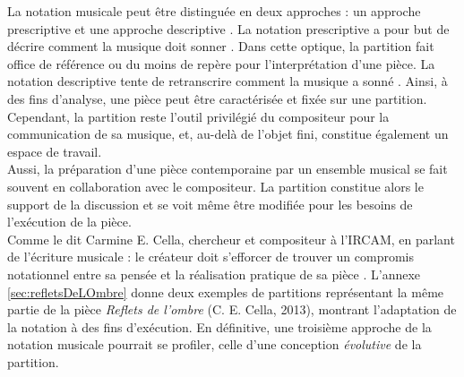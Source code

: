 La notation musicale peut être distinguée en deux approches : un approche prescriptive et une approche descriptive \cite{battier2015}.
La notation prescriptive a pour but de décrire \og comment la musique doit sonner \fg.
Dans cette optique, la partition fait office de référence ou du moins de repère pour l'interprétation d'une pièce. 
La notation descriptive tente de retranscrire \og comment la musique a sonné \fg.
Ainsi, à des fins d'analyse, une pièce peut être caractérisée et fixée sur une partition.
Cependant, la partition reste l'outil privilégié du compositeur pour la communication de sa musique, et, au-delà de l'objet fini, constitue également un espace de travail.\\
Aussi, la préparation d'une pièce contemporaine par un ensemble musical se fait souvent en collaboration avec le compositeur. La partition constitue alors le support de la discussion et se voit même être modifiée pour les besoins de l'exécution de la pièce.\\
Comme le dit Carmine E. Cella, chercheur et compositeur à l'IRCAM, en parlant de l'écriture musicale : \og le créateur doit s'efforcer de trouver un compromis notationnel entre sa pensée et la réalisation pratique de sa pièce \fg. L'annexe \ref{sec:refletsDeLOmbre} donne deux exemples de partitions représentant la même partie de la pièce \textit{Reflets de l'ombre} (C. E. Cella, 2013), montrant l'adaptation de la notation à des fins d'exécution.
En définitive, une troisième approche de la notation musicale pourrait se profiler, celle d'une conception \textit{évolutive} de la partition.
\clearpage